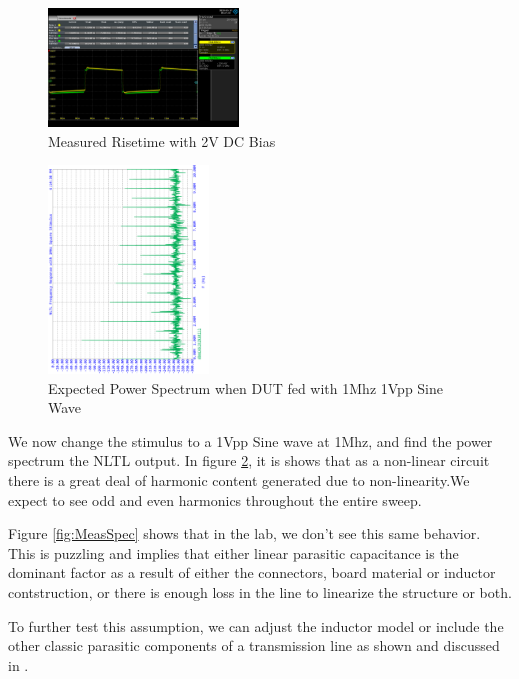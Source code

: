 \documentclass[journal]{IEEEtran} \usepackage[english]{babel}
\begin{document}
\begin{figure}[htb]
\centering
\includegraphics[width=0.45\textwidth]{MeasuredSquare2VBiasB1.png}
\caption{Measured Risetime with 2V DC Bias}
\label{fig:MeasSquare2VBiasB1}
\end{figure}


\begin{figure}[htb]
\centering
\includegraphics[width=0.38\textwidth,angle=-90]{SimulatedSpectrum.png}
\caption{Expected Power Spectrum when DUT fed with 1Mhz 1Vpp Sine Wave}
\label{fig:SimSpec}
\end{figure}

We now change the stimulus to a 1Vpp Sine wave at 1Mhz, and find the power
spectrum the NLTL output. In figure \ref{fig:SimSpec}, it is shows that as a non-linear
circuit there is a great deal of harmonic content generated due to
non-linearity.We expect to see odd and even harmonics throughout the entire
sweep. 

Figure \ref{fig:MeasSpec} shows that in the lab, we don't see this same
behavior. This is puzzling and implies that either linear parasitic capacitance
is the dominant factor as a result of either the connectors, board material or
inductor contstruction, or there is enough loss in the line to linearize the
structure or both. 

To further test this assumption, we can adjust the inductor model or include the
other classic parasitic components of a transmission line as shown and discussed
in \cite{nikoo2018theory}.
\end{document}
